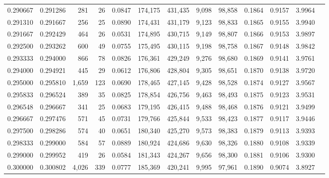 \begin{tabular}{rrrrrrrrrrrrr}
0.290667 & 0.291286 &   281 &  26 &                                     0.0847 & 174,175 & 431,435 &   9,098 &  98,858 & 0.1864 & 0.9157 & 3.9964 \\
0.291310 & 0.291667 &   256 &  25 &                                     0.0890 & 174,431 & 431,179 &   9,123 &  98,833 & 0.1865 & 0.9155 & 3.9940 \\
0.291667 & 0.292429 &   464 &  26 &                                     0.0531 & 174,895 & 430,715 &   9,149 &  98,807 & 0.1866 & 0.9153 & 3.9897 \\
0.292500 & 0.293262 &   600 &  49 &                                     0.0755 & 175,495 & 430,115 &   9,198 &  98,758 & 0.1867 & 0.9148 & 3.9842 \\
0.293333 & 0.294000 &   866 &  78 &                                     0.0826 & 176,361 & 429,249 &   9,276 &  98,680 & 0.1869 & 0.9141 & 3.9761 \\
0.294000 & 0.294921 &   445 &  29 &                                     0.0612 & 176,806 & 428,804 &   9,305 &  98,651 & 0.1870 & 0.9138 & 3.9720 \\
0.295000 & 0.295810 & 1,659 & 123 &                                     0.0690 & 178,465 & 427,145 &   9,428 &  98,528 & 0.1874 & 0.9127 & 3.9567 \\
0.295833 & 0.296524 &   389 &  35 &                                     0.0825 & 178,854 & 426,756 &   9,463 &  98,493 & 0.1875 & 0.9123 & 3.9531 \\
0.296548 & 0.296667 &   341 &  25 &                                     0.0683 & 179,195 & 426,415 &   9,488 &  98,468 & 0.1876 & 0.9121 & 3.9499 \\
0.296667 & 0.297476 &   571 &  45 &                                     0.0731 & 179,766 & 425,844 &   9,533 &  98,423 & 0.1877 & 0.9117 & 3.9446 \\
0.297500 & 0.298286 &   574 &  40 &                                     0.0651 & 180,340 & 425,270 &   9,573 &  98,383 & 0.1879 & 0.9113 & 3.9393 \\
0.298333 & 0.299000 &   584 &  57 &                                     0.0889 & 180,924 & 424,686 &   9,630 &  98,326 & 0.1880 & 0.9108 & 3.9339 \\
0.299000 & 0.299952 &   419 &  26 &                                     0.0584 & 181,343 & 424,267 &   9,656 &  98,300 & 0.1881 & 0.9106 & 3.9300 \\
0.300000 & 0.300802 & 4,026 & 339 &                                     0.0777 & 185,369 & 420,241 &   9,995 &  97,961 & 0.1890 & 0.9074 & 3.8927 \\

\end{tabular}
